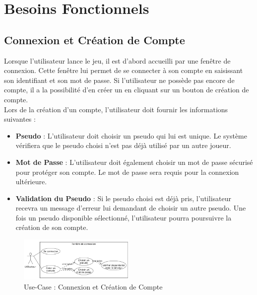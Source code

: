 \documentclass{report}
\begin{document}
\section{Besoins Fonctionnels}
\subsection{Connexion et Création de Compte}

\noindent Lorsque l’utilisateur lance le jeu, il est d'abord accueilli par une fenêtre de connexion. Cette fenêtre lui permet de se connecter à son compte en saisissant son identifiant et son mot de passe. Si l'utilisateur ne possède pas encore de compte, il a la possibilité d'en créer un en cliquant sur un bouton de création de compte. \\

\noindent Lors de la création d'un compte, l'utilisateur doit fournir les informations suivantes :
\begin{itemize}
    \item \textbf{Pseudo} : L'utilisateur doit choisir un pseudo qui lui est unique. Le système vérifiera que le pseudo choisi n'est pas déjà utilisé par un autre joueur.
    \item \textbf{Mot de Passe} : L'utilisateur doit également choisir un mot de passe sécurisé pour protéger son compte. Le mot de passe sera requis pour la connexion ultérieure.
    \item \textbf{Validation du Pseudo} : Si le pseudo choisi est déjà pris, l'utilisateur recevra un message d'erreur lui demandant de choisir un autre pseudo. Une fois un pseudo disponible sélectionné, l'utilisateur pourra poursuivre la création de son compte. \\
\end{itemize}

\vspace{-2em}

\begin{figure}[H]
    \centering
     \includegraphics[width=0.5\textwidth, keepaspectratio]{src/user_req/connexion.png}
    \caption{Use-Case : Connexion et Création de Compte}
    \label{fig:use_case_connexion}
\end{figure}
\end{document}
